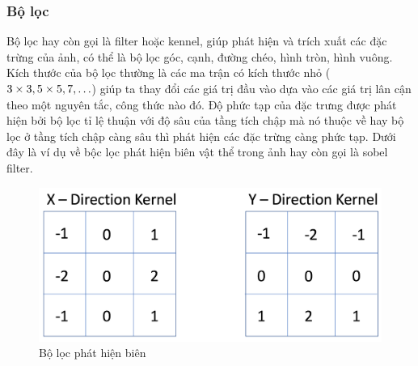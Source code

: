 \subsubsection{Bộ lọc}
  Bộ lọc hay còn gọi là filter hoặc kennel, giúp phát hiện và trích xuất các đặc trừng của ảnh, có thể là bộ lọc góc, cạnh, đường chéo, hình tròn, hình vuông. Kích thước của bộ lọc thường là các ma trận có kích thước nhỏ ($3\times 3, 5\times 5, 7\time7, \ldots$) giúp ta thay đổi các giá trị đầu vào dựa vào các giá trị lân cận theo một nguyên tắc, công thức nào đó. Độ phức tạp của đặc trưng được phát hiện bởi bộ lọc tỉ lệ thuận với độ sâu của tầng tích chập mà nó thuộc về hay bộ lọc ở tầng tích chập càng sâu thì phát hiện các đặc trừng càng phức tạp. Dưới đây là ví dụ về bộc lọc phát hiện biên vật thể trong ảnh hay còn gọi là sobel filter. 
\begin{figure}[H]
	\begin{center}
		\includegraphics[scale=0.5]{chap3/image/cnn/filter/XY_Kernels.png}
	\end{center}
	\caption{Bộ lọc phát hiện biên}
\end{figure}

